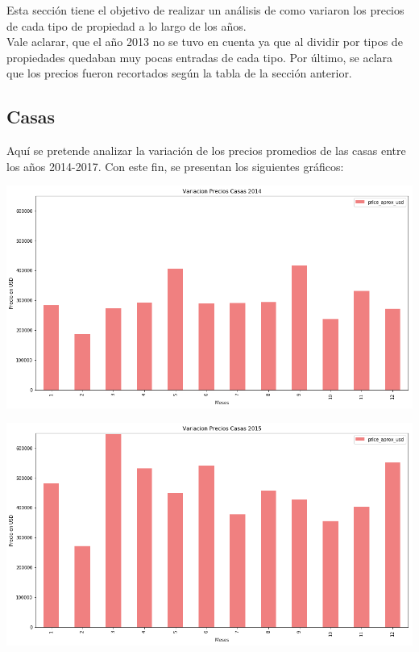 \documentclass[a4paper, 10pt]{article}
\begin{document}
			Esta sección tiene el objetivo de realizar un análisis de como variaron los precios de cada tipo de propiedad a lo largo de los años.\\
			Vale aclarar, que el año 2013 no se tuvo en cuenta ya que al dividir por tipos de propiedades quedaban muy pocas entradas de cada tipo.
			Por último, se aclara que los precios fueron recortados según la tabla de la sección anterior.
			
			\subsection{Casas}
			
			Aquí se pretende analizar la variación de los precios promedios de las casas entre los años 2014-2017. Con este fin, se presentan los siguientes gráficos:	

			\begin{center}
   		    		\includegraphics[width=\textwidth]{images/vCasa2014}
			\end{center}

			\begin{center}
   		    		\includegraphics[width=\textwidth]{images/vCasa2015}
			\end{center}			
			
\end{document}
